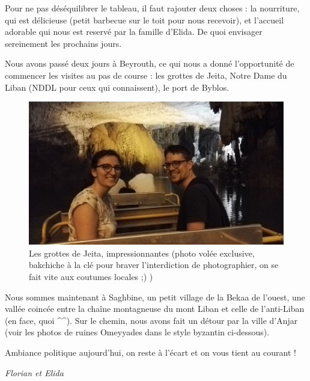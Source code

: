 Pour ne pas déséquilibrer le tableau, il faut rajouter deux choses : la
nourriture, qui est délicieuse (petit barbecue sur le toit pour nous
recevoir), et l'accueil adorable qui nous est reservé par la famille
d'Elida. De quoi envisager sereinement les prochains jours.

\hypertarget{mapid}{}

Nous avons passé deux jours à Beyrouth, ce qui nous a donné
l'opportunité de commencer les visites au pas de course : les grottes de
Jeita, Notre Dame du Liban (NDDL pour ceux qui connaissent), le port de
Byblos.

\begin{figure}
\centering
\includegraphics{images/20180506_Jeita.jpg}
\caption{Les grottes de Jeita, impressionnantes (photo volée exclusive,
bakchiche à la clé pour braver l'interdiction de photographier, on se
fait vite aux coutumes locales ;) )}
\end{figure}

Nous sommes maintenant à Saghbine, un petit village de la Bekaa de
l'ouest, une vallée coincée entre la chaîne montagneuse du mont Liban et
celle de l'anti-Liban (en face, quoi \^{}\^{}). Sur le chemin, nous
avons fait un détour par la ville d'Anjar (voir les photos de ruines
Omeyyades dans le style byzantin ci-dessous).

Ambiance politique aujourd'hui, on reste à l'écart et on vous tient au
courant !

\emph{Florian et Elida}
